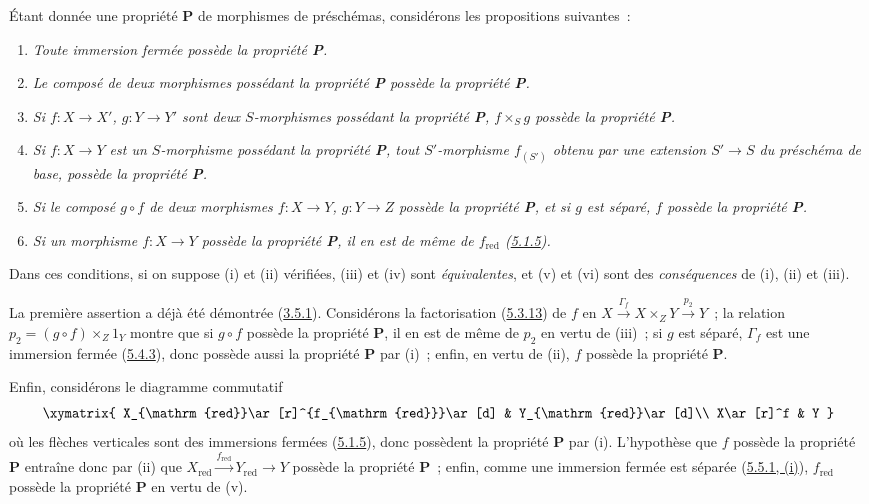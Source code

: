 \begin{remark}[5.5.12]
\label{I.5.5.12-fr}
\normalfont Étant donnée une propriété \textbf{P} de morphismes de préschémas,
considérons les propositions suivantes~:
\begin{enumerate}
  \item[\rm(i)] \emph{Toute immersion fermée possède la propriété \textbf{P}.}
  \item[\rm(ii)] \emph{Le composé de deux morphismes possédant la propriété
    \textbf{P} possède la propriété \textbf{P}.}
  \item[\rm(iii)] \emph{Si $f:X\to X'$, $g:Y\to Y'$ sont deux $S$-morphismes
    possédant la propriété \textbf{P}, $f\times_S g$ possède la propriété
    \textbf{P}.}

  \item[\rm(iv)] \emph{Si $f:X\to Y$ est un $S$-morphisme possédant la
    propriété \textbf{P}, tout $S'$-morphisme $f_{(S')}$ obtenu par une
    extension $S'\to S$ du préschéma de base, possède la propriété
    \textbf{P}.}
  \item[\rm(v)] \emph{Si le composé $g\circ f$ de deux morphismes
    $f:X\to Y$, $g:Y\to Z$ possède la propriété \textbf{P}, et si $g$ est
    séparé, $f$ possède la propriété \textbf{P}.}
  \item[\rm(vi)] \emph{Si un morphisme $f:X\to Y$ possède la propriété
    \textbf{P}, il en est de même de $f_{\mathrm{red}}$
    (\hyperref[I.5.1.5-fr]{5.1.5}).}
\end{enumerate}

Dans ces conditions, si on suppose (i) et (ii) vérifiées, (iii) et (iv) sont
\emph{équivalentes}, et (v) et (vi) sont des \emph{conséquences} de (i), (ii)
et (iii).

La première assertion a déjà été démontrée
(\hyperref[I.3.5.1-fr]{3.5.1}). Considérons la factorisation
(\hyperref[I.5.3.13-fr]{5.3.13}) de $f$ en
$X\xrightarrow{\Gamma_f}X\times_Z Y\xrightarrow{p_2}Y$~; la relation
$p_2=(g\circ f)\times_Z 1_Y$ montre que si $g\circ f$ possède la propriété
\textbf{P}, il en est de même de $p_2$ en vertu de (iii)~; si $g$ est séparé,
$\Gamma_f$ est une immersion fermée
(\hyperref[I.5.4.3-fr]{5.4.3}), donc possède aussi la propriété \textbf{P} par
(i)~; enfin, en vertu de (ii), $f$ possède la propriété \textbf{P}.

Enfin, considérons le diagramme commutatif
\[
  \xymatrix{
    X_{\mathrm{red}}\ar[r]^{f_{\mathrm{red}}}\ar[d] &
    Y_{\mathrm{red}}\ar[d]\\
    X\ar[r]^f &
    Y
  }
\]
où les flèches verticales sont des immersions fermées
(\hyperref[I.5.1.5-fr]{5.1.5}), donc possèdent la propriété \textbf{P} par
(i). L'hypothèse que $f$ possède la propriété \textbf{P} entraîne donc par
(ii) que
$X_{\mathrm{red}}\xrightarrow{f_{\mathrm{red}}}Y_{\mathrm{red}}\to Y$
possède la propriété \textbf{P}~; enfin, comme une immersion fermée est
séparée (\hyperref[I.5.5.1-fr]{5.5.1, (i)}), $f_{\mathrm{red}}$ possède la
propriété \textbf{P} en vertu de (v).


\end{remark}

